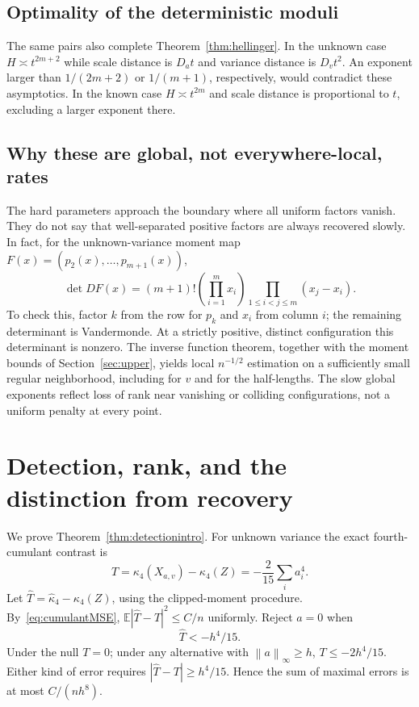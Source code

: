 \documentclass[11pt,a4paper]{article}
\numberwithin{equation}{section}
\theoremstyle{definition}
\theoremstyle{remark}
\newcommand{\E}{\mathbb E}
\newcommand{\norm}[1]{\left\lVert#1\right\rVert}
\newcommand{\kap}{\kappa}
\begin{document}
\subsection{Optimality of the deterministic moduli}
The same pairs also complete Theorem~\ref{thm:hellinger}. In the unknown
case $H\asymp t^{2m+2}$ while scale distance is $D_at$ and variance distance
is $D_vt^2$. An exponent larger than $1/(2m+2)$ or $1/(m+1)$, respectively,
would contradict these asymptotics. In the known case $H\asymp t^{2m}$ and
scale distance is proportional to $t$, excluding a larger exponent there.

\subsection{Why these are global, not everywhere-local, rates}
The hard parameters approach the boundary where all uniform factors vanish.
They do not say that well-separated positive factors are always recovered
slowly. In fact, for the unknown-variance moment map
$F(x)=(p_2(x),\ldots,p_{m+1}(x))$,
\begin{equation}
 \det DF(x)=(m+1)!\left(\prod_{i=1}^m x_i\right)
                   \prod_{1\le i<j\le m}(x_j-x_i).
 \label{eq:jacobian}
\end{equation}
To check this, factor $k$ from the row for $p_k$ and $x_i$ from column $i$;
the remaining determinant is Vandermonde. At a strictly positive, distinct
configuration this determinant is nonzero. The inverse function theorem,
together with the moment bounds of Section~\ref{sec:upper}, yields local
$n^{-1/2}$ estimation on a sufficiently small regular neighborhood, including
for $v$ and for the half-lengths. The slow global exponents reflect loss of
rank near vanishing or colliding configurations, not a uniform penalty at
every point.

\section{Detection, rank, and the distinction from recovery}
\label{sec:testing}

We prove Theorem~\ref{thm:detectionintro}. For unknown variance the exact
fourth-cumulant contrast is
\begin{equation}
 T=\kap_4(X_{a,v})-\kap_4(Z)
   =-\frac{2}{15}\sum_i a_i^4.
 \label{eq:testcontrast}
\end{equation}
Let $\widehat T=\widehat\kap_4-\kap_4(Z)$, using the clipped-moment procedure.
By~\eqref{eq:cumulantMSE}, $\E|\widehat T-T|^2\le C/n$ uniformly. Reject
$a=0$ when
\begin{equation}
 \widehat T<-h^4/15.
\end{equation}
Under the null $T=0$; under any alternative with $\norm a_\infty\ge h$,
$T\le-2h^4/15$. Either kind of error requires
$|\widehat T-T|\ge h^4/15$. Hence the sum of maximal errors is at most
$C/(nh^8)$.
\end{document}
